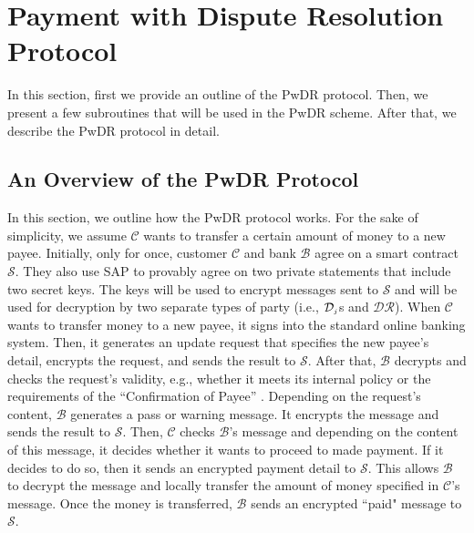 







\section{Payment with Dispute Resolution Protocol}

In this section, first we  provide an outline of the PwDR protocol. Then, we present a few subroutines that will be used in the  PwDR scheme. After that, we describe the PwDR protocol in detail. 




\subsection{An Overview of  the PwDR Protocol}


In this section, we outline how the  PwDR protocol works. For the sake of simplicity, we assume $\mathcal{C}$ wants to transfer a certain amount of money to a new payee. Initially, only for once,  customer  $\mathcal{C}$ and bank  $\mathcal{B}$   agree on a smart contract  $\mathcal{S}$. They also use SAP to provably agree on two private statements that include two  secret keys. The keys will be used to encrypt  messages sent to $\mathcal{S}$ and will be used for decryption by two separate types of party (i.e., $\mathcal{D}_{\scriptscriptstyle j}$s and $\mathcal{DR}$). When $\mathcal{C}$ wants to transfer money to a new payee, it   signs into the standard online banking system. Then, it generates an update  request that specifies the new payee's detail,  encrypts the request, and sends the result to  $\mathcal{S}$. After that, $\mathcal{B}$ decrypts and checks the request's validity, e.g.,  whether it  meets its internal policy or  the requirements of the ``Confirmation of Payee'' \cite{CoP}. Depending on the  request's content, $\mathcal{B}$ generates a pass or warning message. It encrypts the message and sends the result to $\mathcal{S}$. Then, $\mathcal{C}$ checks $\mathcal{B}$'s message and depending on the content of this message, it decides whether it wants to proceed to made  payment. If it decides to do so, then it sends an encrypted payment detail to $\mathcal{S}$. This  allows $\mathcal{B}$ to decrypt the message and locally transfer the amount of money specified in $\mathcal{C}$'s message. Once the money is transferred, $\mathcal{B}$ sends an encrypted  ``paid" message to $\mathcal{S}$. 


